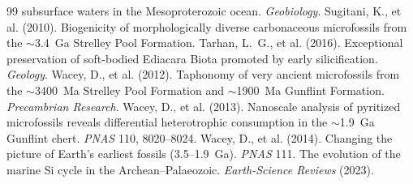 \documentclass[11pt]{article}
\begin{document}
\begin{thebibliography}{99}
subsurface waters in the Mesoproterozoic ocean. \textit{Geobiology}.
 Sugitani, K., et al. (2010). Biogenicity of
morphologically diverse carbonaceous microfossils from the $\sim$3.4~Ga Strelley Pool Formation.
 Tarhan, L.~G., et al. (2016). Exceptional preservation of
soft-bodied Ediacara Biota promoted by early silicification. \textit{Geology}.
 Wacey, D., et al. (2012). Taphonomy of very ancient
microfossils from the $\sim$3400~Ma Strelley Pool Formation and $\sim$1900~Ma Gunflint Formation.
\textit{Precambrian Research}.
 Wacey, D., et al. (2013). Nanoscale analysis of pyritized
microfossils reveals differential heterotrophic consumption in the $\sim$1.9~Ga Gunflint chert.
\textit{PNAS} 110, 8020--8024.
 Wacey, D., et al. (2014). Changing the picture of Earth's
earliest fossils (3.5--1.9~Ga). \textit{PNAS} 111.
 The evolution of the marine Si cycle in the
Archean--Palaeozoic. \textit{Earth-Science Reviews} (2023).
\end{thebibliography}
\end{document}
